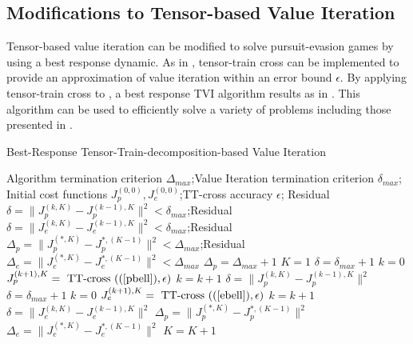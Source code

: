 \subsection{Modifications to Tensor-based Value Iteration}

Tensor-based value iteration can be modified to solve pursuit-evasion games by using a best response dynamic. As in \cite{Gorod}, tensor-train cross can be implemented to provide an approximation of value iteration within an error bound $\epsilon$. By applying tensor-train cross to , a best response TVI algorithm results as in . This algorithm can be used to efficiently solve a variety of problems including those presented in .
\begin{algorithm}
\caption{Best-Response Tensor-Train-decomposition-based Value Iteration }\label{BRTVIalg}
\begin{algorithmic}[1]
	\Require Algorithm termination criterion $\Delta_{max}$;Value Iteration termination criterion $\delta_{max}$; Initial cost functions $J_p^{(0,0)},J_e^{(0,0)}$;TT-cross accuracy $\epsilon$;
	\Ensure Residual $\delta=\|J_p^{(k,K)}-J_p^{(k-1),K}\|^2<\delta_{max}$;Residual $\delta=\|J_e^{(k,K)}-J_e^{(k-1),K}\|^2<\delta_{max}$;Residual $\Delta_p=\|J_p^{(*,K)}-J_p^{*,(K-1)}\|^2<\Delta_{max}$;Residual $\Delta_e=\|J_e^{(*,K)}-J_e^{*,(K-1)}\|^2<\Delta_{max}$
	\State $\Delta_p = \Delta_{max} + 1$
	\State $K = 1$
	 \do{}
		\State $\delta = \delta_{max} + 1$
		\State $k = 0$
		 \do{}
			\State $J_p^{(k+1),K} = \textnormal{ TT-cross }((\ref{pbell}),\epsilon)$
			\State $k = k+1$
			\State $\delta = \|J_p^{(k,K)}-J_p^{(k-1),K}\|^2$
		\EndWhile
		\State $\delta = \delta_{max} + 1$
		\State $k = 0$
		 \do{}
			\State $J_e^{(k+1),K} = \textnormal{ TT-cross }((\ref{ebell}),\epsilon)$
			\State $k = k+1$
			\State $\delta = \|J_e^{(k,K)}-J_e^{(k-1),K}\|^2$
		\EndWhile
		\State $\Delta_p = \|J_p^{(*,K)}-J_p^{*,(K-1)}\|^2$
		\State $\Delta_e = \|J_e^{(*,K)}-J_e^{*,(K-1)}\|^2$
		\State $K = K+1$
	\EndWhile
\end{algorithmic}
\end{algorithm}
 